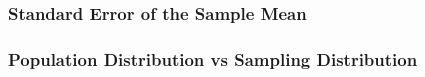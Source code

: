 \documentclass[slides]{beamer}
\newcommand{\blue}[1]{\textcolor{blue2}{#1}}
\newcommand{\xbar}{\overline{x}}
\begin{document}
\begin{frame}[fragile]
\frametitle{Standard Error of the Sample Mean}

%
%
%
%
%
%

\end{frame}


%
%
%
%
%


\begin{frame}[fragile]
\frametitle{Population Distribution vs Sampling Distribution}


\end{frame}
\end{document}
